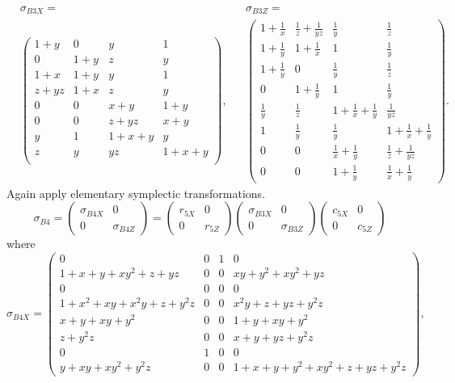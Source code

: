 \begin{align*}
& \sigma_{B3X} = & & \sigma_{B3Z} =\\
& \begin{pmatrix}
 1+y & 0 & y & 1    \\
 0 & 1+y & z & y    \\
 1+x & 1+y & y & 1  \\
 z+y z & 1+x & z & y\\
 0 & 0 & x+y & 1+y  \\
 0 & 0 & z+y z & x+y\\
 y & 1 & 1+x+y & y  \\
 z & y & y z & 1+x+y\\
\end{pmatrix},
& &
\begin{pmatrix}
 1+\frac{1}{x} & \frac{1}{z}+\frac{1}{y z} & \frac{1}{y} & \frac{1}{z} \\
 1+\frac{1}{y} & 1+\frac{1}{x} & 1 & \frac{1}{y} \\
 1+\frac{1}{y} & 0 & \frac{1}{y} & \frac{1}{z} \\
 0 & 1+\frac{1}{y} & 1 & \frac{1}{y} \\
 \frac{1}{y} & \frac{1}{z} & 1+\frac{1}{x}+\frac{1}{y} & \frac{1}{y z} \\
 1 & \frac{1}{y} & \frac{1}{y} & 1+\frac{1}{x}+\frac{1}{y} \\
 0 & 0 & \frac{1}{x}+\frac{1}{y} & \frac{1}{z}+\frac{1}{y z} \\
 0 & 0 & 1+\frac{1}{y} & \frac{1}{x}+\frac{1}{y}
\end{pmatrix}.
\end{align*}
Again apply elementary symplectic transformations.
\[
\sigma_{B4} =
 \begin{pmatrix} \sigma_{B4X} & 0 \\ 0 & \sigma_{B4Z} \end{pmatrix}
=
\begin{pmatrix} r_{5X} & 0 \\ 0 & r_{5Z} \end{pmatrix}
\begin{pmatrix} \sigma_{B3X} & 0 \\ 0 & \sigma_{B3Z} \end{pmatrix}
\begin{pmatrix} c_{5X} & 0 \\ 0 & c_{5Z} \end{pmatrix}
\]
where
\[
 \sigma_{B4X} =
\left(\begin{array}{c|c|c|c}
 0 & 0 & 1 & 0 \\
\hline
 1+x+y+x y^2+z+y z & 0 & 0 & x y+y^2+x y^2+y z \\
\hline
 0 & 0 & 0 & 0 \\
\hline
 1+x^2+x y+x^2 y+z+y^2 z & 0 & 0 & x^2 y+z+y z+y^2 z \\
 x+y+x y+y^2 & 0 & 0 & 1+y+x y+y^2 \\
 z+y^2 z & 0 & 0 & x+y+y z+y^2 z \\
\hline
 0 & 1 & 0 & 0 \\
\hline
 y+x y+x y^2+y^2 z & 0 & 0 & 1+x+y+y^2+x y^2+z+y z+y^2 z
\end{array}\right),
\]
